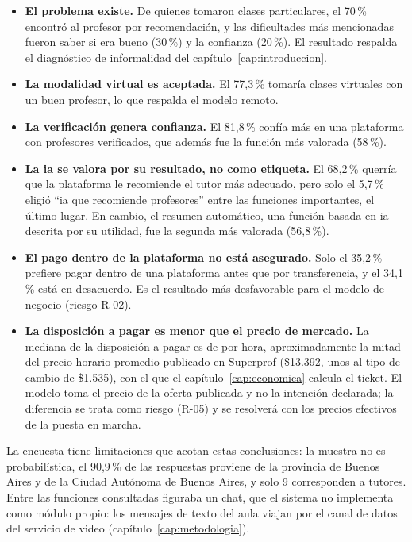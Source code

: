 \begin{itemize}
    \item \textbf{El problema existe.} De quienes tomaron clases
          particulares, el 70\,\% encontró al profesor por recomendación,
          y las dificultades más mencionadas fueron saber si era bueno
          (30\,\%) y la confianza (20\,\%). El resultado respalda el
          diagnóstico de informalidad del capítulo~\ref{cap:introduccion}.
    \item \textbf{La modalidad virtual es aceptada.} El 77,3\,\% tomaría
          clases virtuales con un buen profesor, lo que respalda el
          modelo remoto.
    \item \textbf{La verificación genera confianza.} El 81,8\,\% confía más
          en una plataforma con profesores verificados, que además fue la
          función más valorada (58\,\%).
    \item \textbf{La \gls{ia} se valora por su resultado, no como
          etiqueta.} El 68,2\,\% querría que la plataforma le recomiende
          el tutor más adecuado, pero solo el 5,7\,\% eligió ``\gls{ia} que
          recomiende profesores'' entre las funciones importantes, el
          último lugar. En cambio, el resumen automático, una función
          basada en \gls{ia} descrita por su utilidad, fue la segunda más
          valorada (56,8\,\%).
    \item \textbf{El pago dentro de la plataforma no está asegurado.}
          Solo el 35,2\,\% prefiere pagar dentro de una plataforma antes
          que por transferencia, y el 34,1\,\% está en desacuerdo. Es el
          resultado más desfavorable para el modelo de negocio (riesgo
          R-02).
    \item \textbf{La disposición a pagar es menor que el precio de
          mercado.} La mediana de la disposición a pagar es de
           por hora, aproximadamente la mitad del precio
          horario promedio publicado en Superprof (\$13.392, unos
           al tipo de cambio de \$1.535), con el que el
          capítulo~\ref{cap:economica} calcula el ticket. El modelo toma
          el precio de la oferta publicada y no la intención declarada; la
          diferencia se trata como riesgo (R-05) y se resolverá con los
          precios efectivos de la puesta en marcha.
\end{itemize}

La encuesta tiene limitaciones que acotan estas conclusiones: la muestra
no es probabilística, el 90,9\,\% de las respuestas proviene de la
provincia de Buenos Aires y de la Ciudad Autónoma de Buenos Aires, y
solo 9 corresponden a tutores. Entre las funciones consultadas figuraba
un chat, que el sistema no implementa como módulo propio: los mensajes de
texto del aula viajan por el canal de datos del servicio de video
(capítulo~\ref{cap:metodologia}).

